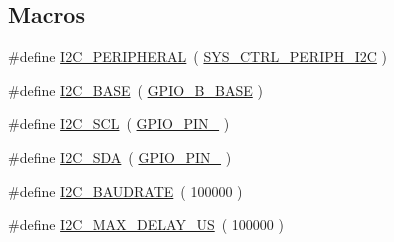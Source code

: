 \subsection*{Macros}
\begin{DoxyCompactItemize}
\item 
\#define \hyperlink{_open_mote-_c_c2538_2i2c_8c_a946d4dc7e4d2270c1388c78ba919ce83}{I2\+C\+\_\+\+P\+E\+R\+I\+P\+H\+E\+R\+AL}~( \hyperlink{sys__ctrl_8h_a29cf5103983df6eec9aac959a621c4e0}{S\+Y\+S\+\_\+\+C\+T\+R\+L\+\_\+\+P\+E\+R\+I\+P\+H\+\_\+\+I2C} )
\item 
\#define \hyperlink{_open_mote-_c_c2538_2i2c_8c_a7ee5d64af207612578a7c77b58f1dd33}{I2\+C\+\_\+\+B\+A\+SE}~( \hyperlink{hw__memmap_8h_a518c8d6318f4e8f448dbbedbc413a26b}{G\+P\+I\+O\+\_\+\+B\+\_\+\+B\+A\+SE} )
\item 
\#define \hyperlink{_open_mote-_c_c2538_2i2c_8c_a212ca328a6409c98f8c3dfbbe1ba561d}{I2\+C\+\_\+\+S\+CL}~( \hyperlink{_open_mote-_c_c2538_2source_2gpio_8h_adcaf899c018a0dde572b5af783565c62}{G\+P\+I\+O\+\_\+\+P\+I\+N\+\_} )
\item 
\#define \hyperlink{_open_mote-_c_c2538_2i2c_8c_a18aefd12ad84d4c33dc97923cb821e47}{I2\+C\+\_\+\+S\+DA}~( \hyperlink{_open_mote-_c_c2538_2source_2gpio_8h_ab3871e35868deecd260e586ad70d4b83}{G\+P\+I\+O\+\_\+\+P\+I\+N\+\_} )
\item 
\#define \hyperlink{_open_mote-_c_c2538_2i2c_8c_a31568ea8caf00a3ec699c01652c771d0}{I2\+C\+\_\+\+B\+A\+U\+D\+R\+A\+TE}~( 100000 )
\item 
\#define \hyperlink{_open_mote-_c_c2538_2i2c_8c_ab51eba8e1881ce7b5a0a1adbc6dd2b2c}{I2\+C\+\_\+\+M\+A\+X\+\_\+\+D\+E\+L\+A\+Y\+\_\+\+US}~( 100000 )
\end{DoxyCompactItemize}
